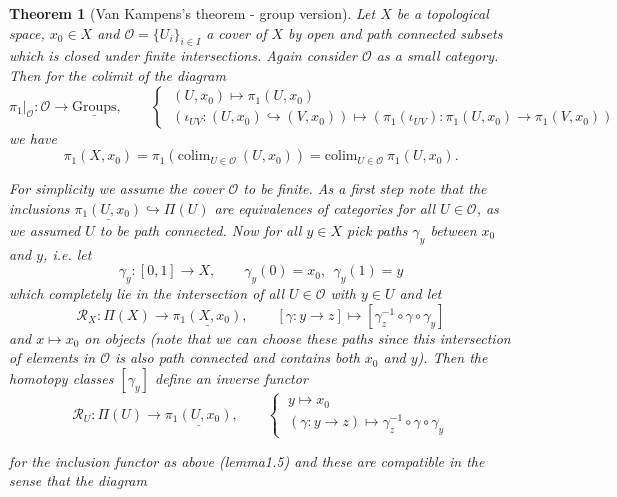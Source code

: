 \documentclass[11pt]{book}
\numberwithin{dummy}{section}
\newtheorem{theorem}{Theorem}[section]
\theoremstyle{nonumberbreak}
\newenvironment{pr}[1][]{\ifthenelse{\equal{#1}{}}{\proof}{\proof[#1]}\rm}{\endproof}
\newcommand{\grp}{\underline{\mathrm{Groups}}}
\newcommand{\la}{\longrightarrow}
\begin{document}
\begin{spacing}{1.4}
\begin{theorem}[Van Kampens's theorem - group version]
Let $X$ be a topological space, $x_0 \in X$ and $\mathcal{O} = \{U_i \}_{i \in I}$ a cover of $X$ by open and path connected subsets which is closed under finite intersections. Again consider $\mathcal{O}$ as a small category. Then for the colimit of the diagram
$$\pi_1 \vert_{\mathcal{O}}: \mathcal{O} \la \grp, \qquad \begin{cases} \ (U,x_0) \mapsto \pi_1(U,x_0) \\ \ (\iota_{UV}: (U,x_0) \hookrightarrow (V,x_0)) \mapsto (\pi_1(\iota_{UV}): \pi_1(U, x_0) \la \pi_1(V, x_0)) \end{cases}$$
we have
$$ \pi_1(X,x_0) = \pi_1 \left( \mathrm{colim}_{U \in \mathcal{O}} \ (U,x_0) \right) = \mathrm{colim}_{U \in \mathcal{O}} \ \pi_1(U,x_0).$$

\begin{pr}
For simplicity we assume the cover $\mathcal{O}$ to be finite. As a first step note that the inclusions $\underline{\pi_1(U,x_0)} \hookrightarrow \Pi(U)$ are equivalences of categories for all $U \in \mathcal{O}$, as we assumed $U$ to be path connected. Now for all $y \in X$ pick paths $\gamma_y$ between $x_0$ and $y$, i.e. let
$$\gamma_y: [0,1] \la X, \qquad \gamma_y(0) = x_0, \ \ \gamma_y(1) =y$$
which completely lie in the intersection of all $U \in \mathcal{O}$ with $y \in U$ and let $$\mathcal{R}_X: \Pi(X) \la \underline{\pi_1(X, x_0)}, \qquad [\gamma: y \la z] \mapsto [ \gamma_z^{-1} \circ \gamma \circ \gamma_y]$$
and $x \mapsto x_0$ on objects (note that we can choose these paths since this intersection of elements in $\mathcal{O}$ is also path connected and contains both $x_0$ and $y$). Then the homotopy classes $[\gamma_y]$ define an inverse functor 
$$\mathcal{R}_U: \Pi(U) \la \underline{\pi_1(U,x_0)}, \qquad \begin{cases} \ y \mapsto x_0 \\ \ (\gamma: y \la z ) \mapsto \gamma_z^{-1} \circ \gamma \circ \gamma_y \end{cases}$$

for the inclusion functor as above (lemma1.5) and these are compatible in the sense that the diagram



\end{pr}
\end{theorem}
\end{spacing}
\end{document}
